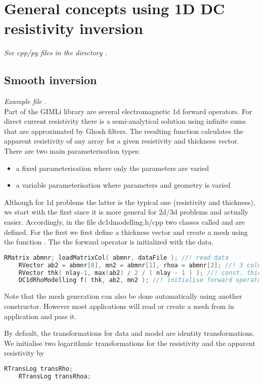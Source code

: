 \section{General concepts using 1D DC resistivity inversion}\label{sec:dc1d}
{\em See cpp/py files in the directory .}
\subsection{Smooth inversion}\label{sec:dc1dsmooth}
{\em Example file .}\\
Part of the GIMLi library are several electromagnetic 1d forward operators.
For direct current resistivity there is a semi-analytical solution using infinite sums that are approximated by Ghosh filters. 
The resulting function calculates the apparent resistivity of any array for a given resistivity and thickness vector.
There are two main parameterisation types:
\begin{itemize}
	\item a fixed parameterisation where only the parameters are varied 
	\item a variable parameterisation where parameters and geometry is varied
\end{itemize}

Although for 1d problems the latter is the typical one (resistivity and thickness), we start with the first since it is more general for 2d/3d problems and actually easier.
Accordingly, in the file dc1dmodelling.h/cpp two classes called  and  are defined.
For the first we first define a thickness vector and create a mesh using the function .
The the forward operator is initialized with the data.

\begin{lstlisting}[language=C++]
    RMatrix abmnr; loadMatrixCol( abmnr, dataFile ); //! read data
    RVector ab2 = abmnr[0], mn2 = abmnr[1], rhoa = abmnr[2]; //! 3 columns
    RVector thk( nlay-1, max(ab2) / 2 / ( nlay - 1 ) ); //! const. thickn.
    DC1dRhoModelling f( thk, ab2, mn2 ); //! initialise forward operator
\end{lstlisting}

Note that the mesh generation can also be done automatically using another constructor.
However most applications will read or create a mesh from in application and pass it.

By default, the transformations for data and model are identity transformations.
We initialise two logarithmic transformations for the resistivity and the apparent resistivity by 
\begin{lstlisting}[language=C++]
    RTransLog transRho;
    RTransLog transRhoa;
\end{lstlisting}

